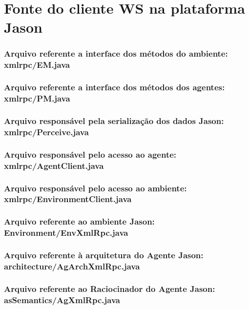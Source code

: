 \chapter{Fonte do cliente WS na plataforma Jason} \label{anexo-jason}

\lstset{language=Java}
\lstset{linewidth=140mm}
\lstset{backgroundcolor=}
\lstset{breaklines=true}
\lstset{nolol}

\subsection*{Arquivo referente a interface dos métodos do ambiente: xmlrpc/EM.java}


\subsection*{Arquivo referente a interface dos métodos dos agentes: xmlrpc/PM.java}


\subsection*{Arquivo responsável pela serialização dos dados Jason: xmlrpc/Perceive.java}


\subsection*{Arquivo responsável pelo acesso ao agente: xmlrpc/AgentClient.java}


\subsection*{Arquivo responsável pelo acesso ao ambiente: xmlrpc/EnvironmentClient.java}


\subsection*{Arquivo referente ao ambiente Jason: Environment/EnvXmlRpc.java}


\subsection*{Arquivo referente à arquitetura do Agente Jason: architecture/AgArchXmlRpc.java}


\subsection*{Arquivo referente ao Raciocinador do Agente Jason: asSemantics/AgXmlRpc.java}

